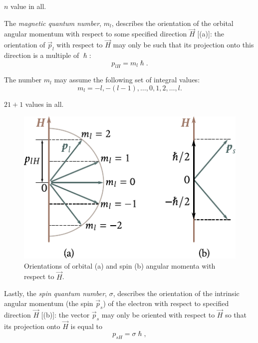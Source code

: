 \noindent
$n$ value in all.

The \textit{magnetic quantum number}, $m_l$, describes the orientation of the orbital angular momentum with respect to some specified direction $\vec{H}$ [(a)]: the orientation of $\vec{p}_l$ with respect to $\vec{H}$ may only be such that its projection onto this direction is a multiple of $\hslash$:
\begin{equation}\label{eq:5_3}
    p_{lH} = m_l \hslash.
\end{equation}

\noindent
The number $m_l$ may assume the following set of integral values:
\begin{equation}\label{eq:5_3p}
    m_l = -l, -(l-1), \ldots, 0, 1, 2, \ldots, l. \tag{5.3$'$}
\end{equation}

\noindent
$21 + 1$ values in all.

\begin{figure}[t]
	\begin{center}
		\includegraphics[scale=1]{figures/ch_05/fig_5_1.pdf}
		\caption[]{Orientations of orbital (a) and spin (b) angular momenta with respect to $\vec{H}$.}
		\label{fig:5_1}
	\end{center}
	\vspace{-0.7cm}
\end{figure}

Lastly, the \textit{spin quantum number}, $\sigma$, describes the orientation of the intrinsic angular momentum (the spin $\vec{p}_s$) of the electron with respect to specified direction $\vec{H}$ [(b)]: the vector $\vec{p}_s$ may only be oriented with respect to $\vec{H}$ so that its projection onto $\vec{H}$ is equal to
\begin{equation}\label{eq:5_4}
    p_{sH} = \sigma \hslash,
\end{equation}

